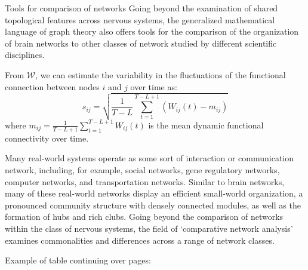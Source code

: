 \documentclass[NETN]{stjour}
\begin{document}
\begin{boxedtext}{Tools for comparison of networks} 
Going beyond the examination of shared topological features across
nervous systems, the generalized mathematical language of graph theory
also offers tools for the comparison of the organization of brain
networks to other classes of network studied by different scientific
disciplines. 

From $\mathcal{W}$, we can estimate the variability in the fluctuations of the functional connection between nodes $i$ and $j$ over time as:
\begin{equation}
s_{ij}=\sqrt{\frac{1}{T-L}\sum_{t=1}^{T-L+1}(W_{ij}(t) - m_{ij})}
\end{equation}
where $m_{ij}=\frac{1}{T-L+1}\sum_{t=1}^{T-L+1}W_{ij}(t)$ is the mean
dynamic functional connectivity over time. 

Many real-world systems operate as some sort of
interaction or communication network, including, for example, social
networks, gene regulatory networks, computer networks, and
transportation networks. Similar to brain networks, many of these
real-world networks display an efficient small-world organization, a
pronounced community structure with densely connected modules, as well
as the formation of hubs and rich clubs. Going beyond the
comparison of networks within the class of nervous systems, the field
of `comparative network analysis' examines commonalities and
differences across a range of network classes.
\end{boxedtext}

Example of table continuing over pages:
\end{document}
